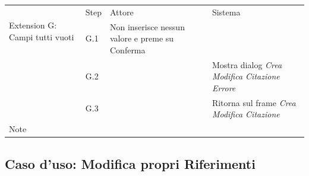 \begin{table}[H]
\begin{tabularx}{\linewidth}{|l|X|X|X|}
 \hline
 
  \multirow{2}{*}{Extension G: Campi tutti vuoti} & Step & Attore & Sistema \\
  \cline{2-4} & G.1 & Non inserisce nessun valore e preme su Conferma & \\
  \cline{2-4} & G.2 & & Mostra dialog \textit{Crea Modifica Citazione Errore} \\
  \cline{2-4} & G.3 & & Ritorna sul frame \textit{Crea Modifica Citazione} \\

 \hline Note & \multicolumn{3}{l|}{} \\
 \hline


\end{tabularx}
\end{table}

\newpage
\raggedright{\subsection{Caso d'uso: Modifica propri Riferimenti}}

